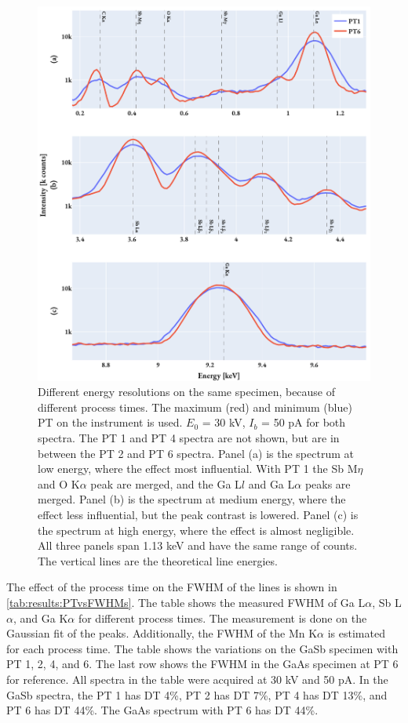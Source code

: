 \begin{figure}[hptb]
    \centering
    \includegraphics[width=0.95\linewidth]{figures/results/eds_energyResolutions_process_time.pdf}
    \caption{
        Different energy resolutions on the same specimen, because of different process times.
        The maximum (red) and minimum (blue) PT on the instrument is used.
        $E_0$ = 30 kV, $I_b$ = 50 pA for both spectra.
        The PT 1 and PT 4 spectra are not shown, but are in between the PT 2 and PT 6 spectra.
        Panel (a) is the spectrum at low energy, where the effect most influential.
        With PT 1 the Sb M$\eta$ and O K$\alpha$ peak are merged, and the Ga L$l$ and Ga L$\alpha$ peaks are merged.
        Panel (b) is the spectrum at medium energy, where the effect less influential, but the peak contrast is lowered.
        Panel (c) is the spectrum at high energy, where the effect is almost negligible.
        All three panels span 1.13 keV and have the same range of counts.
        The vertical lines are the theoretical line energies.
    }
    \label{fig:results:energy_resolutions_process_time}
\end{figure}


The effect of the process time on the FWHM of the lines is shown in \cref{tab:results:PTvsFWHMs}.
The table shows the measured FWHM of Ga L$\alpha$, Sb L$\alpha$, and Ga K$\alpha$ for different process times.
The measurement is done on the Gaussian fit of the peaks.
Additionally, the FWHM of the Mn K$\alpha$ is estimated for each process time.
The table shows the variations on the GaSb specimen with PT 1, 2, 4, and 6.
The last row shows the FWHM in the GaAs specimen at PT 6 for reference.
All spectra in the table were acquired at 30 kV and 50 pA.
In the GaSb spectra, the PT 1 has DT 4\%, PT 2 has DT 7\%, PT 4 has DT 13\%, and PT 6 has DT 44\%.
The GaAs spectrum with PT 6 has DT 44\%.

